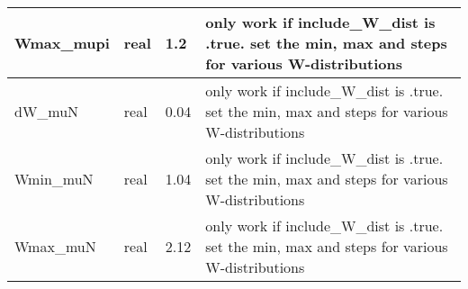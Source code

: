 \documentclass{article}
\begin{document}
\begin{longtable}{llll}
\midrule
Wmax\_mupi & \begin{minipage}[t]{2cm}real\end{minipage} & \begin{minipage}[t]{2cm}1.2\end{minipage} & \begin{minipage}[t]{12cm}only work if include\_W\_dist is .true. set the min, max and steps for various W-distributions\end{minipage}\\*
\midrule
dW\_muN & \begin{minipage}[t]{2cm}real\end{minipage} & \begin{minipage}[t]{2cm}0.04\end{minipage} & \begin{minipage}[t]{12cm}only work if include\_W\_dist is .true. set the min, max and steps for various W-distributions\end{minipage}\\*
\midrule
Wmin\_muN & \begin{minipage}[t]{2cm}real\end{minipage} & \begin{minipage}[t]{2cm}1.04\end{minipage} & \begin{minipage}[t]{12cm}only work if include\_W\_dist is .true. set the min, max and steps for various W-distributions\end{minipage}\\*
\midrule
Wmax\_muN & \begin{minipage}[t]{2cm}real\end{minipage} & \begin{minipage}[t]{2cm}2.12\end{minipage} & \begin{minipage}[t]{12cm}only work if include\_W\_dist is .true. set the min, max and steps for various W-distributions\end{minipage}\\*
\bottomrule
\end{longtable}
{ }



\end{document}
